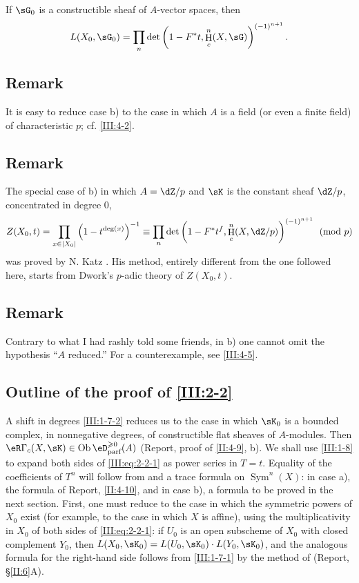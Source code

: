 \documentclass[12pt,oneside,english]{smfbook}
\DeclareMathOperator{\h}{H}
\DeclareMathOperator{\ob}{Ob}
\newcounter{char}
\begin{document}
\subsubsection{}\label{III:2-4-1}

If $\sG_0$ is a constructible sheaf of $A$-vector spaces, then
\[
  L(X_0,\sG_0) = \prod_n \det\left(1-F^* t,\h_c^n(X,\sG)\right)^{(-1)^{n+1}} \text{.}
\]

\subsection{Remark}\label{III:2-5}

It is easy to reduce case b) to the case in which $A$ is a field (or even a finite field) of characteristic $p$; cf. \ref{III:4-2}.

\subsection{Remark}\label{III:2-6}

The special case of b) in which $A=\dZ/p$ and $\sK$ is the constant sheaf $\dZ/p$, concentrated in degree $0$,
\[
  Z(X_0,t) = \prod_{x\in |X_0|} \left(1-t^{\deg(x)}\right)^{-1}
      \equiv \prod_n \det\left(1-F^* t^f,\h_c^n(X,\dZ/p)\right)^{(-1)^{n+1}} \pmod p
\]
was proved by N. Katz \cite[XXII 3.1]{sga7}. His method, entirely different from the one followed here, starts from Dwork's $p$-adic theory of $Z(X_0,t)$.

\subsection{Remark}\label{III:2-7}

Contrary to what I had rashly told some friends, in b) one cannot omit the hypothesis ``$A$ reduced.'' For a counterexample, see \ref{III:4-5}.

\subsection{Outline of the proof of \ref{III:2-2}}\label{III:2-8}

A shift in degrees \ref{III:1-7-2} reduces us to the case in which $\sK_0$ is a bounded complex, in nonnegative degrees, of constructible flat sheaves of $A$-modules. Then $\eR\Gamma_c(X,\sK)\in\ob\eD_\text{parf}^{\geqslant0}(A)$ (Report, proof of \ref{II:4-9}, b). We shall use \ref{III:1-8} to expand both sides of \eqref{III:eq:2-2-1} as power series in $T=t$. Equality of the coefficients of $T^n$ will follow from \cite[XVII 5.5.21]{sga4} and a trace formula on $\operatorname{Sym}^n(X)$: in case a), the formula of Report, \ref{II:4-10}, and in case b), a formula to be proved in the next section. First, one must reduce to the case in which the symmetric powers of $X_0$ exist (for example, to the case in which $X$ is affine), using the multiplicativity in $X_0$ of both sides of \eqref{III:eq:2-2-1}: if $U_0$ is an open subscheme of $X_0$ with closed complement $Y_0$, then $L(X_0,\sK_0)=L(U_0,\sK_0)\cdot L(Y_0,\sK_0)$, and the analogous formula for the right-hand side follows from \ref{III:1-7-1} by the method of (Report, \S\ref{II:6}A).
\end{document}

